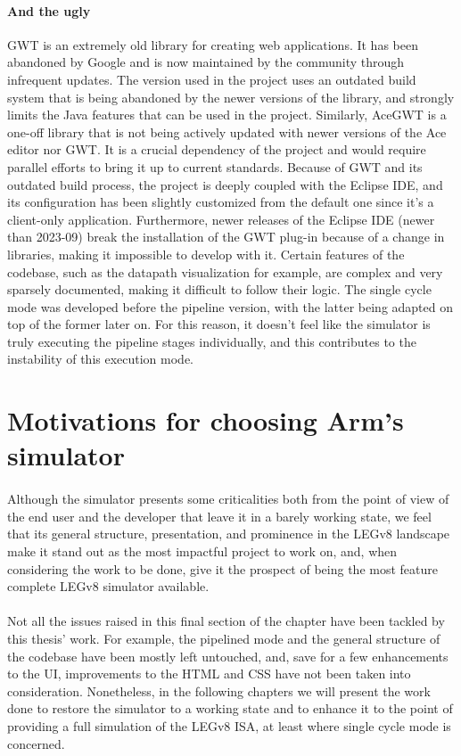 \paragraph{And the ugly}
GWT is an extremely old library for creating web applications. It has been abandoned by Google and is now maintained by the community through infrequent updates. The version used in the project uses an outdated build system that is being abandoned by the newer versions of the library, and strongly limits the Java features that can be used in the project. Similarly, AceGWT is a one-off library that is not being actively updated with newer versions of the Ace editor nor GWT. It is a crucial dependency of the project and would require parallel efforts to bring it up to current standards. Because of GWT and its outdated build process, the project is deeply coupled with the Eclipse IDE, and its configuration has been slightly customized from the default one since it's a client-only application. Furthermore, newer releases of the Eclipse IDE (newer than 2023-09) break the installation of the GWT plug-in because of a change in libraries, making it impossible to develop with it. Certain features of the codebase, such as the datapath visualization for example, are complex and very sparsely documented, making it difficult to follow their logic. The single cycle mode was developed before the pipeline version, with the latter being adapted on top of the former later on. For this reason, it doesn't feel like the simulator is truly executing the pipeline stages individually, and this contributes to the instability of this execution mode.
\section{Motivations for choosing Arm's simulator}
\paragraph{}
Although the simulator presents some criticalities both from the point of view of the end user and the developer that leave it in a barely working state, we feel that its general structure, presentation, and prominence in the LEGv8 landscape make it stand out as the most impactful project to work on, and, when considering the work to be done, give it the prospect of being the most feature complete LEGv8 simulator available.
\paragraph{}
Not all the issues raised in this final section of the chapter have been tackled by this thesis' work. For example, the pipelined mode and the general structure of the codebase have been mostly left untouched, and, save for a few enhancements to the UI, improvements to the HTML and CSS have not been taken into consideration. Nonetheless, in the following chapters we will present the work done to restore the simulator to a working state and to enhance it to the point of providing a full simulation of the LEGv8 ISA, at least where single cycle mode is concerned.